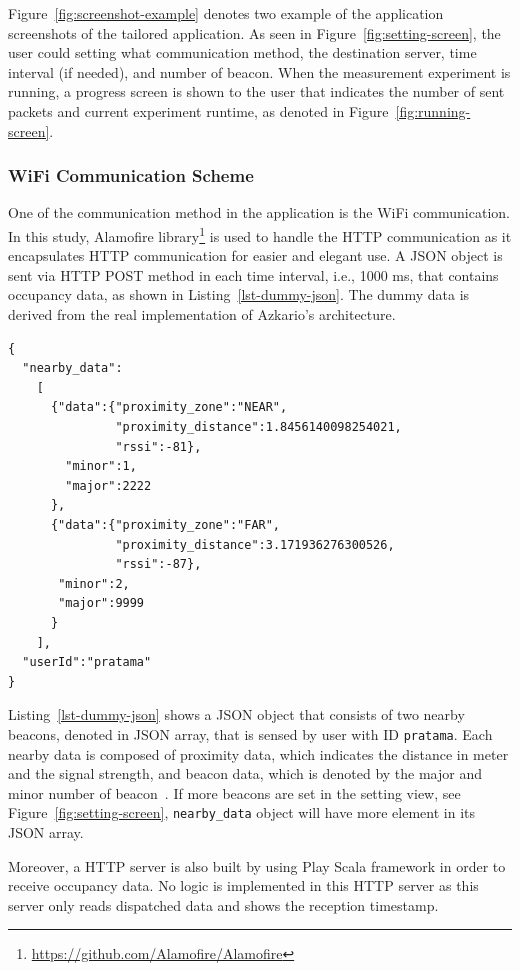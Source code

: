 \documentclass[journal]{vgtc}                %
\begin{document}
Figure~\ref{fig:screenshot-example} denotes two example of the application screenshots of the tailored application. As seen in Figure~\ref{fig:setting-screen}, the user could setting what communication method, the destination server, time interval (if needed), and number of beacon. When the measurement experiment is running, a progress screen is shown to the user that indicates the number of sent packets and current experiment runtime, as denoted in Figure~\ref{fig:running-screen}.

\subsubsection{WiFi Communication Scheme} %
\label{ssub:wifi_communication_scheme}
One of the communication method in the application is the WiFi communication. In this study, Alamofire library\footnote{\url{https://github.com/Alamofire/Alamofire}} is used to handle the HTTP communication as it encapsulates HTTP communication for easier and elegant use. A JSON object is sent via HTTP POST method in each time interval, i.e., 1000 ms, that contains occupancy data, as shown in Listing~\ref{lst-dummy-json}. The dummy data is derived from the real implementation of Azkario's architecture.

\begin{lstlisting}[caption=Example of dummy occupancy data in JSON., label=lst-dummy-json]
{
  "nearby_data":
    [
      {"data":{"proximity_zone":"NEAR",
               "proximity_distance":1.8456140098254021,
               "rssi":-81},
        "minor":1,
        "major":2222
      },
      {"data":{"proximity_zone":"FAR",
               "proximity_distance":3.171936276300526,
               "rssi":-87},
       "minor":2,
       "major":9999
      }
    ],
  "userId":"pratama"
}
\end{lstlisting}

Listing~\ref{lst-dummy-json} shows a JSON object that consists of two nearby beacons, denoted in JSON array, that is sensed by user with ID \texttt{pratama}. Each nearby data is composed of proximity data, which indicates the distance in meter and the signal strength, and beacon data, which is denoted by the major and minor number of beacon~\cite{AppleInc.2014}. If more beacons are set in the setting view, see Figure~\ref{fig:setting-screen}, \texttt{nearby\_data} object will have more element in its JSON array.

Moreover, a HTTP server is also built by using Play Scala framework in order to receive occupancy data. No logic is implemented in this HTTP server as this server only reads dispatched data and shows the reception timestamp.
\end{document}
